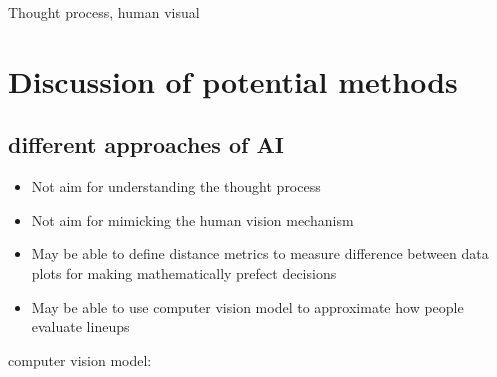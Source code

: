 \documentclass{monashthesis}
\theoremstyle{definition}
\theoremstyle{definition}
\theoremstyle{definition}
\theoremstyle{definition}
\theoremstyle{remark}
\begin{document}
Thought process, human visual

\hypertarget{discussion-of-potential-methods}{%
\section{Discussion of potential methods}\label{discussion-of-potential-methods}}

\hypertarget{different-approaches-of-ai}{%
\subsection{different approaches of AI}\label{different-approaches-of-ai}}

\begin{itemize}
\tightlist
\item
  Not aim for understanding the thought process
\item
  Not aim for mimicking the human vision mechanism
\item
  May be able to define distance metrics to measure difference between data plots for making mathematically prefect decisions
\item
  May be able to use computer vision model to approximate how people evaluate lineups
\end{itemize}

computer vision model:
\end{document}
